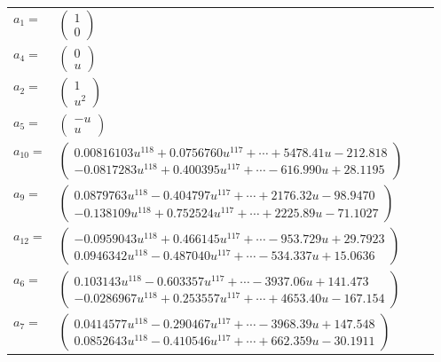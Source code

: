 \documentclass[1p]{elsarticle_modified}
\theoremstyle{definition}
\begin{document}
\begin{tabular}{m{7pt} m{180pt} m{7pt} m{180pt} }
\flushright $a_{1}=$&$\begin{pmatrix}1\\0\end{pmatrix}$ \\
\flushright $a_{4}=$&$\begin{pmatrix}0\\u\end{pmatrix}$ \\
\flushright $a_{2}=$&$\begin{pmatrix}1\\u^2\end{pmatrix}$ \\
\flushright $a_{5}=$&$\begin{pmatrix}- u\\u\end{pmatrix}$ \\
\flushright $a_{10}=$&$\begin{pmatrix}0.00816103 u^{118}+0.0756760 u^{117}+\cdots+5478.41 u-212.818\\-0.0817283 u^{118}+0.400395 u^{117}+\cdots-616.990 u+28.1195\end{pmatrix}$ \\
\flushright $a_{9}=$&$\begin{pmatrix}0.0879763 u^{118}-0.404797 u^{117}+\cdots+2176.32 u-98.9470\\-0.138109 u^{118}+0.752524 u^{117}+\cdots+2225.89 u-71.1027\end{pmatrix}$ \\
\flushright $a_{12}=$&$\begin{pmatrix}-0.0959043 u^{118}+0.466145 u^{117}+\cdots-953.729 u+29.7923\\0.0946342 u^{118}-0.487040 u^{117}+\cdots-534.337 u+15.0636\end{pmatrix}$ \\
\flushright $a_{6}=$&$\begin{pmatrix}0.103143 u^{118}-0.603357 u^{117}+\cdots-3937.06 u+141.473\\-0.0286967 u^{118}+0.253557 u^{117}+\cdots+4653.40 u-167.154\end{pmatrix}$ \\
\flushright $a_{7}=$&$\begin{pmatrix}0.0414577 u^{118}-0.290467 u^{117}+\cdots-3968.39 u+147.548\\0.0852643 u^{118}-0.410546 u^{117}+\cdots+662.359 u-30.1911\end{pmatrix}$ \\

\end{tabular}
\end{document}
